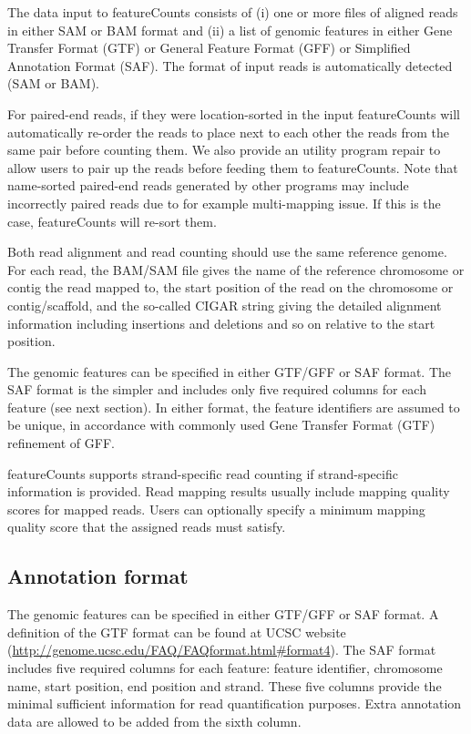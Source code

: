 \documentclass[12pt]{report}
\newcommand{\featureCounts}{\textsf{featureCounts}}
\newcommand{\repair}{\textsf{repair}}
\begin{document}
The data input to {\featureCounts} consists of (i) one or more files of aligned reads in either SAM or BAM format and (ii) a list of genomic features in either Gene Transfer Format (GTF) or General Feature Format (GFF) or Simplified Annotation Format (SAF). The format of input reads is automatically detected (SAM or BAM).

For paired-end reads, if they were location-sorted in the input {\featureCounts} will automatically re-order the reads to place next to each other the reads from the same pair before counting them.
We also provide an utility program {\repair} to allow users to pair up the reads before feeding them to {\featureCounts}.
Note that name-sorted paired-end reads generated by other programs may include incorrectly paired reads due to for example multi-mapping issue.
If this is the case, {\featureCounts} will re-sort them.

Both read alignment and read counting should use the same reference genome. For each read, the BAM/SAM file gives the name of the reference chromosome or contig the read mapped to, the start position of the read on the chromosome or contig/scaffold, and the so-called CIGAR string giving the detailed alignment information including insertions and deletions and so on relative to the start position.

The genomic features can be specified in either GTF/GFF or SAF format. The SAF format is the simpler and includes only five required columns for each feature (see next section). In either format, the feature identifiers are assumed to be unique, in accordance with commonly used Gene Transfer Format (GTF) refinement of GFF.

{\featureCounts} supports strand-specific read counting if strand-specific information is provided. Read mapping results usually include mapping quality scores for mapped reads. Users can optionally specify a minimum mapping quality score that the assigned reads must satisfy.

\subsection{Annotation format}
\label{sec:annotation}

The genomic features can be specified in either GTF/GFF or SAF format.
A definition of the GTF format can be found at UCSC website (\url{http://genome.ucsc.edu/FAQ/FAQformat.html#format4}).
The SAF format includes five required columns for each feature: feature identifier, chromosome name, start position, end position and strand.
These five columns provide the minimal sufficient information for read quantification purposes.
Extra annotation data are allowed to be added from the sixth column. 
\end{document}
